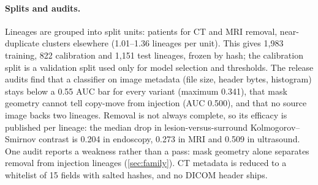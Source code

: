 \paragraph{Splits and audits.}
Lineages are grouped into split units: patients for CT and MRI removal, near-duplicate clusters elsewhere (1.01--1.36 lineages per unit). %
This gives 1,983 training, 822 calibration and 1,151 test lineages, frozen by hash; %
the calibration split is a validation split used only for model selection and thresholds.
The release audits find that a classifier on image metadata (file size, header bytes, histogram) stays below a 0.55 AUC bar for every variant (maximum 0.341), %
that mask geometry cannot tell copy-move from injection (AUC 0.500), %
and that no source image backs two lineages. %
Removal is not always complete, so its efficacy is published per lineage: the median drop in lesion-versus-surround Kolmogorov--Smirnov contrast is 0.204 in endoscopy, 0.273 in MRI and 0.509 in ultrasound. %
One audit reports a weakness rather than a pass: mask geometry alone separates removal from injection lineages (\cref{sec:family}).
CT metadata is reduced to a whitelist of 15 fields with salted hashes, and no DICOM header ships. %
